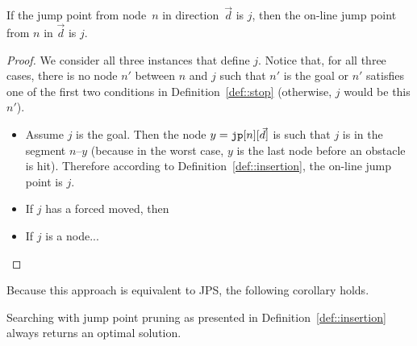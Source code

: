 \begin{lemma}
  If the jump point from node~$n$ in direction~$\vec{d}$ is $j$, 
  then the on-line jump point from $n$ in $\vec{d}$ is $j$.  
\end{lemma}

\begin{proof}
  We consider all three instances that define $j$.  
  Notice that, for all three cases, 
  there is no node $n'$ between $n$ and $j$ 
  such that $n'$ is the goal or $n'$ satisfies 
  one of the first two conditions in Definition~\ref{def::stop} 
  (otherwise, $j$ would be this $n'$).  
  \begin{itemize}
  \item 
    Assume $j$ is the goal.  
    Then the node $y = \texttt{jp}[n][\vec{d}]$ 
    is such that $j$ is in the segment $n$--$y$ 
    (because in the worst case, 
    $y$ is the last node before an obstacle is hit).  
    Therefore according to Definition~\ref{def::insertion}, 
    the on-line jump point is $j$.  
  \item 
    If $j$ has a forced moved, then 
  \item 
    If $j$ is a node...
  \end{itemize}
\end{proof}

Because this approach is equivalent to JPS, 
the following corollary holds.  

\begin{corollary}
  Searching with jump point pruning 
  as presented in Definition~\ref{def::insertion} 
  always returns an optimal solution.  
\end{corollary}

